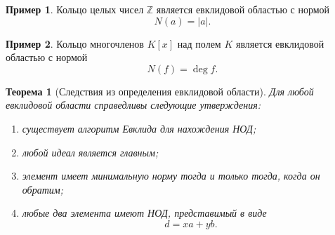 \documentclass[12pt, a4paper]{article}
\newtheorem{theorem}{Теорема}
\theoremstyle{definition}
\newtheorem{example}{Пример}
\theoremstyle{remark}
\begin{document}
\begin{example}
	Кольцо целых чисел $\mathbb{Z}$ является евклидовой областью
	с нормой
	\[
	N(a)=|a|.
	\]
\end{example}

\begin{example}
	Кольцо многочленов $K[x]$ над полем $K$ является евклидовой областью
	с нормой
	\[
	N(f)=\deg f.
	\]
\end{example}

\begin{theorem}[Следствия из определения евклидовой области]
	Для любой евклидовой области справедливы следующие утверждения:
	\begin{enumerate}
		\item существует алгоритм Евклида для нахождения НОД;
		\item любой идеал является главным;
		\item элемент имеет минимальную норму тогда и только тогда,
		когда он обратим;
		\item любые два элемента имеют НОД, представимый в виде
		\[
		d=xa+yb.
		\]
	\end{enumerate}
\end{theorem}
\end{document}
